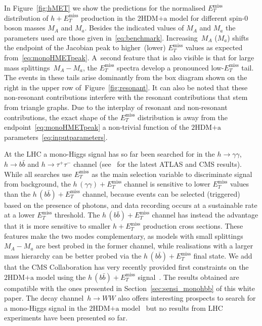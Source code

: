\documentclass[a4paper, 11pt,notoc]{article}
\newcommand{\MET}{\ensuremath{E_T^\mathrm{miss}}\xspace}
\newcommand{\mA}{\ensuremath{M_{A}}\xspace}
\newcommand{\ma}{\ensuremath{M_{a}}\xspace}
\newcommand{\hdma}{\ensuremath{\textrm{2HDM+a}}\xspace}
\begin{document}
In Figure~\ref{fig:hMET} we show the predictions for the normalised $\MET$ distribution of $h+\MET$ production in the \hdma model for different spin-0 boson masses $\mA$ and $\ma$. Besides the indicated values of $\mA$ and $\ma$ the parameters  used  are those given in~\eqref{eq:benchmark}. Increasing~$\mA$ ($\ma$) shifts the endpoint of the Jacobian peak to higher~(lower) $\MET$  values as expected from~\eqref{eq:monoHMETpeak}. A~second feature that is also visible is that for large mass splittings~$\mA - \ma$, the $\MET$ spectra develop a pronounced low-$\MET$ tail. The events in these tails arise dominantly from the box diagram shown on the right in the upper row of~Figure~\ref{fig:resonant}. It can also be noted that these non-resonant contributions interfere with the resonant contributions that stem from triangle graphs. Due to the interplay of resonant and non-resonant contributions,  the exact shape of the $\MET$ distribution is away from the endpoint~\eqref{eq:monoHMETpeak} a non-trivial function of the \hdma parameters~\eqref{eq:inputparameters}.  

 At the LHC a mono-Higgs signal has so far been searched for in the $h \to \gamma \gamma$, $h \to b \bar b$ and $h \to \tau^+ \tau^-$ channel (see~\cite{Aaboud:2017uak,ATLAS-CONF-2018-039,CMS-PAS-EXO-16-050,CMS:2018yme,Sirunyan:2018qob}  for the latest ATLAS and CMS results).  While all searches use $\MET$ as the main selection variable to discriminate signal from background,  the  $h \, (\gamma \gamma) + \MET$  channel  is sensitive to lower $\MET$ values than the $h \, (b \bar b) + \MET$  channel, because events can be selected (triggered) based on the presence of photons, and data recording occurs at a sustainable rate at a lower $\MET$ threshold. The $h \, (b \bar b) + \MET$  channel has instead the advantage that it is more sensitive to smaller $h + \MET$ production cross sections. These features make the two modes complementary, as models with  small  splittings $\mA - \ma$ are best probed in the former channel, while realisations with a larger mass hierarchy can be better probed via the $h \, (b \bar b) + \MET$ final state. We add that the CMS Collaboration has very recently provided first constraints on the \hdma model using the $h \, (b \bar b) + \MET$ signal~\cite{CMS-PAS-EXO-16-050}. The results obtained are compatible with the ones presented in Section~\ref{sec:sensi_monohbb} of this white paper. The decay channel~$h \to WW$ also offers interesting prospects to search for a mono-Higgs signal in the \hdma model~\cite{GPHeidelberg} but no results from LHC experiments have been presented so far. 
\end{document}
